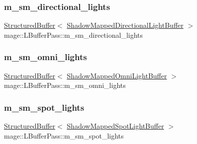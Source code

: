\hypertarget{classmage_1_1_l_buffer_pass_a37a31075c8906191cce6141db50e3b5c}{}\label{classmage_1_1_l_buffer_pass_a37a31075c8906191cce6141db50e3b5c} 
\subsubsection{\texorpdfstring{m\+\_\+sm\+\_\+directional\+\_\+lights}{m\_sm\_directional\_lights}}
{\footnotesize\ttfamily \hyperlink{classmage_1_1_structured_buffer}{Structured\+Buffer}$<$ \hyperlink{structmage_1_1_shadow_mapped_directional_light_buffer}{Shadow\+Mapped\+Directional\+Light\+Buffer} $>$ mage\+::\+L\+Buffer\+Pass\+::m\+\_\+sm\+\_\+directional\+\_\+lights\hspace{0.3cm}{\ttfamily [private]}}

\hypertarget{classmage_1_1_l_buffer_pass_a8eec79470d3ee5a5f8f71931de533131}{}\label{classmage_1_1_l_buffer_pass_a8eec79470d3ee5a5f8f71931de533131} 
\subsubsection{\texorpdfstring{m\+\_\+sm\+\_\+omni\+\_\+lights}{m\_sm\_omni\_lights}}
{\footnotesize\ttfamily \hyperlink{classmage_1_1_structured_buffer}{Structured\+Buffer}$<$ \hyperlink{structmage_1_1_shadow_mapped_omni_light_buffer}{Shadow\+Mapped\+Omni\+Light\+Buffer} $>$ mage\+::\+L\+Buffer\+Pass\+::m\+\_\+sm\+\_\+omni\+\_\+lights\hspace{0.3cm}{\ttfamily [private]}}

\hypertarget{classmage_1_1_l_buffer_pass_a034b3ec298eb4c4c3688c0ebaed91883}{}\label{classmage_1_1_l_buffer_pass_a034b3ec298eb4c4c3688c0ebaed91883} 
\subsubsection{\texorpdfstring{m\+\_\+sm\+\_\+spot\+\_\+lights}{m\_sm\_spot\_lights}}
{\footnotesize\ttfamily \hyperlink{classmage_1_1_structured_buffer}{Structured\+Buffer}$<$ \hyperlink{structmage_1_1_shadow_mapped_spot_light_buffer}{Shadow\+Mapped\+Spot\+Light\+Buffer} $>$ mage\+::\+L\+Buffer\+Pass\+::m\+\_\+sm\+\_\+spot\+\_\+lights\hspace{0.3cm}{\ttfamily [private]}}

